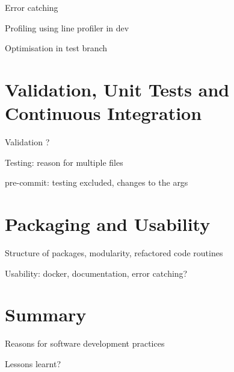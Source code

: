 \documentclass[12pt]{article}
\begin{document}
Error catching

Profiling using line profiler in dev

Optimisation in test branch

\section*{Validation, Unit Tests and Continuous Integration}

Validation ?

Testing: reason for multiple files

pre-commit: testing excluded, changes to the args

\section*{Packaging and Usability}

Structure of packages, modularity, refactored code routines

Usability: docker, documentation, error catching?

\section*{Summary}

Reasons for software development practices

Lessons learnt?


\end{document}
